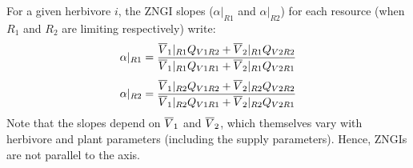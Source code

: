\documentclass[12pt]{article}
\newcommand\barre[1]{\overline{\rule{0pt}{1.5ex}#1}}
\begin{document}
For a given herbivore $i$, the ZNGI slopes ($\alpha|_{R1}$ and $\alpha|_{R2}$) for each resource (when $R_1$ and $R_2$ are limiting respectively) write:
\begin{equation}\label{alpha}
\alpha|_{R1}=\frac{\barre{V}_1|_{R1}Q_{V1R2}+\barre{V}_2|_{R1}Q_{V2R2}}{\barre{V}_1|_{R1}Q_{V1R1}+\barre{V}_2|_{R1}Q_{V2R1}}
\end{equation}
\begin{equation}\label{alpha}
\alpha|_{R2}=\frac{\barre{V}_1|_{R2}Q_{V1R2}+\barre{V}_2|_{R2}Q_{V2R2}}{\barre{V}_1|_{R2}Q_{V1R1}+\barre{V}_2|_{R2}Q_{V2R1}}
\end{equation}
Note that the slopes depend on $\barre{V}_1$ and $\barre{V}_2$, which themselves vary with herbivore and plant parameters (including the supply parameters). Hence, ZNGIs are not parallel to the axis. \par
\end{document}
